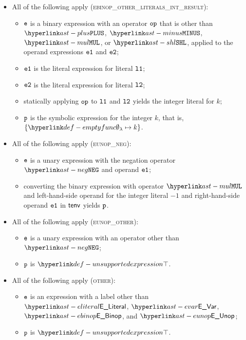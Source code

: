 \begin{itemize}
  \item All of the following apply (\textsc{ebinop\_other\_literals\_int\_result}):
  \begin{itemize}
    \item $\texttt{e}$ is a binary expression with an operator $\texttt{op}$ that is other than $\PLUS$, $\MINUS$, $\MUL$, or $\SHL$,
          applied to the operand expressions $\texttt{e1}$ and $\texttt{e2}$;
    \item $\texttt{e1}$ is the literal expression for literal $\texttt{l1}$;
    \item $\texttt{e2}$ is the literal expression for literal $\texttt{l2}$;
    \item statically applying $\texttt{op}$ to $\texttt{l1}$ and $\texttt{l2}$ yields the integer literal for $k$;
    \item $\texttt{p}$ is the symbolic expression for the integer $k$, that is, $\{ \emptyfunc\mapsto k \}$.
  \end{itemize}

  \item All of the following apply (\textsc{eunop\_neg}):
  \begin{itemize}
    \item $\texttt{e}$ is a unary expression with the negation operator $\NEG$ and operand $\texttt{e1}$;
    \item converting the binary expression with operator $\MUL$ and left-hand-side operand for the integer literal $-1$ and
    right-hand-side operand $\texttt{e1}$ in $\textsf{tenv}$ yields $\texttt{p}$\ProseOrTypeErrorOrBot.
  \end{itemize}

  \item All of the following apply (\textsc{eunop\_other}):
  \begin{itemize}
    \item $\texttt{e}$ is a unary expression with an operator other than $\NEG$;
    \item $\texttt{p}$ is $\CannotBeTransformed$.
  \end{itemize}

  \item All of the following apply (\textsc{other}):
  \begin{itemize}
    \item $\texttt{e}$ is an expression with a label other than $\ELiteral$, $\EVar$, $\EBinop$, and $\EUnop$;
    \item $\texttt{p}$ is $\CannotBeTransformed$.
  \end{itemize}
\end{itemize}

